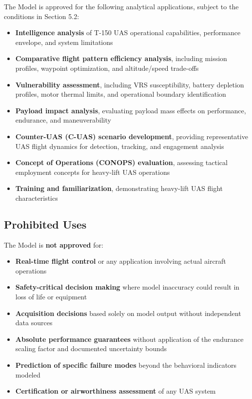 \documentclass[11pt, letterpaper]{article}
\begin{document}
\unclass The Model is approved for the following analytical applications, subject to the conditions in Section 5.2:

\begin{itemize}
    \item \unclass \textbf{Intelligence analysis} of T-150 UAS operational capabilities, performance envelope, and system limitations
    \item \unclass \textbf{Comparative flight pattern efficiency analysis}, including mission profiles, waypoint optimization, and altitude/speed trade-offs
    \item \unclass \textbf{Vulnerability assessment}, including VRS susceptibility, battery depletion profiles, motor thermal limits, and operational boundary identification
    \item \unclass \textbf{Payload impact analysis}, evaluating payload mass effects on performance, endurance, and maneuverability
    \item \unclass \textbf{Counter-UAS (C-UAS) scenario development}, providing representative UAS flight dynamics for detection, tracking, and engagement analysis
    \item \unclass \textbf{Concept of Operations (CONOPS) evaluation}, assessing tactical employment concepts for heavy-lift UAS operations
    \item \unclass \textbf{Training and familiarization}, demonstrating heavy-lift UAS flight characteristics
\end{itemize}

\subsection{\unclass Prohibited Uses}

\unclass The Model is \textbf{not approved} for:

\begin{itemize}
    \item \unclass \textbf{Real-time flight control} or any application involving actual aircraft operations
    \item \unclass \textbf{Safety-critical decision making} where model inaccuracy could result in loss of life or equipment
    \item \unclass \textbf{Acquisition decisions} based solely on model output without independent data sources
    \item \unclass \textbf{Absolute performance guarantees} without application of the endurance scaling factor and documented uncertainty bounds
    \item \unclass \textbf{Prediction of specific failure modes} beyond the behavioral indicators modeled
    \item \unclass \textbf{Certification or airworthiness assessment} of any UAS system
\end{itemize}
\end{document}
